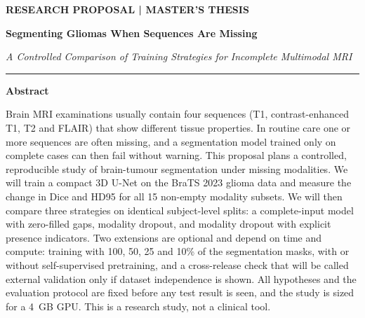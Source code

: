 \documentclass[11pt,a4paper]{article}
\begin{document}
\thispagestyle{first}

\noindent
\begin{minipage}[t]{0.665\linewidth}\vspace{0pt}
  {\headfont\footnotesize\bfseries\color{warmgrey}\MakeUppercase{Research proposal \;|\; Master's thesis}\par}
  \vspace{6pt}
  {\raggedright{}\headfont\bfseries\fontsize{21}{25}\selectfont\color{accent} Segmenting Gliomas When Sequences Are Missing\par}
  \vspace{6pt}
  {\raggedright{}\itshape A Controlled Comparison of Training Strategies for Incomplete Multimodal MRI\par}
  \vspace{4pt}
  {\color{accent}\rule{\linewidth}{0.8pt}}\par
  \vspace{2pt}
  {\headfont\small\bfseries\color{accent} Abstract}\par
  \small{}\sloppy
  Brain MRI examinations usually contain four sequences (T1, contrast-enhanced T1, T2 and FLAIR) that show different tissue properties. In routine care one or more sequences are often missing, and a segmentation model trained only on complete cases can then fail without warning. This proposal plans a controlled, reproducible study of brain-tumour segmentation under missing modalities. We will train a compact 3D U-Net on the BraTS 2023 glioma data and measure the change in Dice and HD95 for all 15 non-empty modality subsets. We will then compare three strategies on identical subject-level splits: a complete-input model with zero-filled gaps, modality dropout, and modality dropout with explicit presence indicators. Two extensions are optional and depend on time and compute: training with 100, 50, 25 and 10\% of the segmentation masks, with or without self-supervised pretraining, and a cross-release check that will be called external validation only if dataset independence is shown. All hypotheses and the evaluation protocol are fixed before any test result is seen, and the study is sized for a 4~GB GPU. This is a research study, not a clinical tool.
\end{minipage}\hfill
\end{document}
